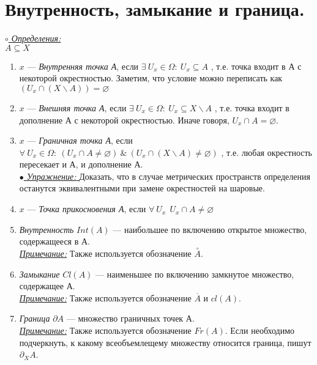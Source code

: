 \section{Внутренность, замыкание и граница.}
\underline{\textit{$\circ$ Определения:}}\\
$A\subseteq X$
\begin{enumerate}
\item $x$ --- \emph{Внутренняя точка А}, если $\exists ~U_{x}\in\Omega:~U_{x}\subseteq A$ , т.е. точка входит в А с некоторой окрестностью. Заметим, что условие можно переписать как $(U_{x}\cap(X\backslash A))=\varnothing$
\item $x$ --- \emph{Внешняя точка А}, если $\exists ~U_{x}\in\Omega:~U_{x}\subseteq X\backslash A$ , т.е. точка входит в дополнение А с некоторой окрестностью. Иначе говоря, $U_{x}\cap A=\varnothing$.
\item $x$ --- \emph{Граничная точка А}, если $\forall ~U_{x}\in\Omega:~(U_{x}\cap A\neq\varnothing) ~\& ~ (U_{x}\cap(X\backslash A)\neq\varnothing)$ , т.е. любая окрестность пересекает и А, и дополнение А.
\\ \underline{\emph{$\bullet$ Упражнение: }} Доказать, что в случае метрических пространств определения останутся эквивалентными при замене окрестностей на шаровые.
\item $x$ --- \emph{Точка прикосновения А}, если $\forall~U_{x}~~U_{x}\cap A\neq \varnothing$
\item \emph{Внутренность} $Int(A)$ --- наибольшее по включению открытое множество, содержащееся в А.
\\ \underline{\emph{Примечание:}} Также используется обозначение $\overset{\circ}{A}$.
\item \emph{Замыкание} $Cl(A)$ --- наименьшее по включению замкнутое множество, содержащее А.
\\ \underline{\emph{Примечание:}} Также используется обозначение $\overline{A}$ и $cl(A)$.
\item \emph{Граница} $\partial A$ --- множество граничных точек А. 
\\ \underline{\emph{Примечание:}} Также используется обозначение $Fr(A)$. Если необходимо подчеркнуть, к какому всеобъемлещему множеству относится граница, пишут $\partial_{X}A$.
\end{enumerate}
